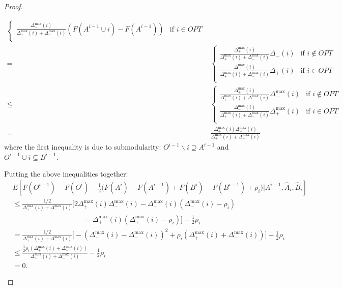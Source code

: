 \begin{proof}
\begin{description}
\begin{align*}
\begin{cases}
    \frac{\Delta_-^{\max}(i)}{\Delta_+^{\max}(i) + \Delta_-^{\max}(i)} (F(A^{i-1}\cup i) - F(A^{i-1}))       & \text{if $i    \in OPT$}\\
\end{cases}\\
=&\begin{cases}
    \frac{\Delta_+^{\max}(i)}{\Delta_+^{\max}(i) + \Delta_-^{\max}(i)} \Delta_-(i) & \text{if $i\not\in OPT$}\\
    \frac{\Delta_-^{\max}(i)}{\Delta_+^{\max}(i) + \Delta_-^{\max}(i)} \Delta_+(i) & \text{if $i    \in OPT$}\\
\end{cases}\\
\leq&\begin{cases}
    \frac{\Delta_+^{\max}(i)}{\Delta_+^{\max}(i) + \Delta_-^{\max}(i)} \Delta_-^{\max}(i) & \text{if $i\not\in OPT$}\\
    \frac{\Delta_-^{\max}(i)}{\Delta_+^{\max}(i) + \Delta_-^{\max}(i)} \Delta_+^{\max}(i) & \text{if $i    \in OPT$}\\
\end{cases}\\
=& \frac{\Delta_+^{\max}(i)\Delta_-^{\max}(i)}{\Delta_+^{\max}(i) + \Delta_-^{\max}(i)}
\end{align*}
where the first inequality is due to submodularity: $O^{i-1}\backslash i \supseteq A^{i-1}$ and $O^{i-1}\cup i \subseteq B^{i-1}$.

Putting the above inequalities together:
\begin{align*}
&E\left[F(O^{i-1}) - F(O^i) - \frac{1}{2} \bigg(F(A^i) - F(A^{i-1}) + F(B^i) - F(B^{i-1}) + \rho_i\bigg) \bigg| A^{i-1}, \hat{A}_i, \hat{B}_i\right]\\
&\leq \frac{1/2}{\Delta_+^{\max}(i) + \Delta_-^{\max}(i)}\bigg[
2\Delta_+^{\max}(i)\Delta_-^{\max}(i)
- \Delta_-^{\max}(i)(\Delta_-^{\max}(i) - \rho_i)\\
&\quad\quad\quad\quad\quad\quad\quad\quad\quad\quad- \Delta_+^{\max}(i)(\Delta_+^{\max}(i) - \rho_i)
\bigg]- \frac{1}{2}\rho_i\\
&= \frac{1/2}{\Delta_+^{\max}(i) + \Delta_-^{\max}(i)}\bigg[-(\Delta_+^{\max}(i) - \Delta_-^{\max}(i))^2 + \rho_i(\Delta_+^{\max}(i) + \Delta_-^{\max}(i))\bigg] - \frac{1}{2}\rho_i\\
&\leq \frac{\frac{1}{2}\rho_i(\Delta_+^{\max}(i) + \Delta_-^{\max}(i))}{\Delta_+^{\max}(i) + \Delta_-^{\max}(i)} - \frac{1}{2}\rho_i\\
&= 0.
\end{align*}


\end{description}
\end{proof}
